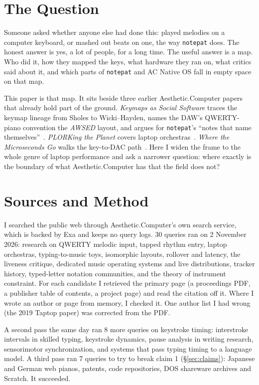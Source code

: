 \documentclass[10pt,letterpaper,twocolumn]{article}
\newcommand{\acdot}{{\color{acpink}.}}
\newcommand{\ac}{Aesthetic{\acdot}Computer}
\newcommand{\acos}{AC Native OS}
\newcommand{\np}{\texttt{notepat}}
\begin{document}
\section{The Question}

Someone asked whether anyone else had done this: played melodies on a computer keyboard, or mashed out beats on one, the way \np{} does. The honest answer is yes, a lot of people, for a long time. The useful answer is a map. Who did it, how they mapped the keys, what hardware they ran on, what critics said about it, and which parts of \np{} and \acos{} fall in empty space on that map.

This paper is that map. It sits beside three earlier \ac{} papers that already hold part of the ground. \emph{Keymaps as Social Software} traces the keymap lineage from Sholes to Wicki--Hayden, names the DAW's QWERTY-piano convention the \emph{AWSED} layout, and argues for \np{}'s ``notes that name themselves''~\citep{scudder2026keymaps}. \emph{PLORKing the Planet} covers laptop orchestras~\citep{scudder2026plork}. \emph{Where the Microseconds Go} walks the key-to-DAC path~\citep{scudder2026latency}. Here I widen the frame to the whole genre of laptop performance and ask a narrower question: where exactly is the boundary of what \ac{} has that the field does not?

\section{Sources and Method}

I searched the public web through \ac{}'s own search service, which is backed by Exa and keeps no query logs. 30 queries ran on 2 November 2026: research on QWERTY melodic input, tapped rhythm entry, laptop orchestras, typing-to-music toys, isomorphic layouts, rollover and latency, the liveness critique, dedicated music operating systems and live distributions, tracker history, typed-letter notation communities, and the theory of instrument constraint. For each candidate I retrieved the primary page (a proceedings PDF, a publisher table of contents, a project page) and read the citation off it. Where I wrote an author or page from memory, I checked it. One author list I had wrong (the 2019 Taptop paper) was corrected from the PDF.

A second pass the same day ran 8 more queries on keystroke timing: interstroke intervals in skilled typing, keystroke dynamics, pause analysis in writing research, sensorimotor synchronization, and systems that pass typing timing to a language model. A third pass ran 7 queries to try to break claim 1 (§\ref{sec:claims}): Japanese and German web pianos, patents, code repositories, DOS shareware archives and Scratch. It succeeded.
\end{document}
